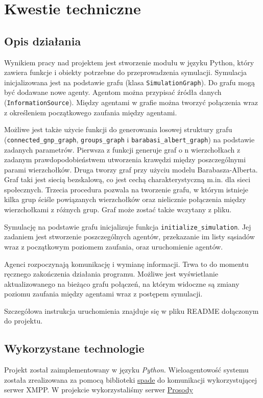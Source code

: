 \documentclass{article}
\begin{document}
	\section{Kwestie techniczne}
	\subsection{Opis działania}
	Wynikiem pracy nad projektem jest stworzenie modułu w języku Python, który zawiera funkcje i obiekty potrzebne do przeprowadzenia symulacji. Symulacja inicjalizowana jest na podstawie grafu (klasa {\tt SimulationGraph}). Do grafu mogą być dodawane nowe agenty. Agentom można przypisać źródła danych ({\tt InformationSource}). Między agentami w grafie można tworzyć połączenia wraz z określeniem początkowego zaufania między agentami. 
	
	Możliwe jest także użycie funkcji do generowania losowej struktury grafu ({\tt connected\_gnp\_graph}, {\tt groups\_graph} i {\tt barabasi\_albert\_graph}) na podstawie zadanych parametrów. Pierwsza z funkcji generuje graf o n wierzchołkach z zadanym prawdopodobieństwem utworzenia krawędzi między poszczególnymi parami wierzchołków. Druga tworzy graf przy użyciu modelu Barabasza-Alberta. Graf taki jest siecią bezskalową, co jest cechą charakterystyczną m.in. dla sieci społecznych. Trzecia procedura pozwala na tworzenie grafu, w którym istnieje kilka grup ściśle powiązanych wierzchołków oraz nielicznie połączenia między wierzchołkami z różnych grup. Graf może zostać także wczytany z pliku. 
	
	Symulację na podstawie grafu inicjalizuje funkcja {\tt initialize\_simulation}. Jej zadaniem jest stworzenie poszczególnych agentów, przekazanie im listy sąsiadów wraz z początkowym poziomem zaufania, oraz uruchomienie agentów.
	
	Agenci rozpoczynają komunikację i wymianę informacji. Trwa to do momentu ręcznego zakończenia działania programu. Możliwe jest wyświetlanie aktualizowanego na bieżąco grafu połączeń, na którym widoczne są zmiany poziomu zaufania między agentami wraz z postępem symulacji.
	
	Szczegółowa instrukcja uruchomienia znajduje się w pliku README dołączonym do projektu.

	\subsection{Wykorzystane technologie}
	Projekt został zaimplementowany w języku \textit{Python}. Wieloagentowość systemu została zrealizowana za pomocą biblioteki \href{https://pypi.org/project/spade/}{spade} do komunikacji wykorzystującej serwer XMPP. W projekcie wykorzystaliśmy serwer \href{https://prosody.im/}{Prosody} 
	
\end{document}
